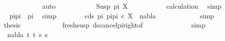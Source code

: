 \begin{isabellebody}
\ \ \ \ \ \ \ \ \isamarkupfalse%
\ {\isachardoublequoteopen}{}{\isachardoublequoteclose}{\isacharparenleft}{\kern0pt}{}{\isacharparenright}{\kern0pt}\ \isamarkupfalse%
\ auto\isanewline
\ \ \ \ \ \ \isamarkupfalse%
\ \isamarkupfalse%
\ {\isachardoublequoteopen}{\isachardot}{\kern0pt}{\isachardot}{\kern0pt}{\isachardot}{\kern0pt}\ {\isacharequal}{\kern0pt}\ Susp\ pi{}\ X{\isachardoublequoteclose}\isanewline
\ \ \ \ \ \ \ \ \isamarkupfalse%
\ {}{\isacharparenleft}{\kern0pt}{}{\isacharparenright}{\kern0pt}\ calculation\ \isamarkupfalse%
\ simp\isanewline
\ \ \ \ \ \ \isamarkupfalse%
\ \isamarkupfalse%
\ {\isachardoublequoteopen}pi{\isacharat}{\kern0pt}pi{}\ {\isacharequal}{\kern0pt}\ pi{}{\isachardoublequoteclose}\ \isamarkupfalse%
\ simp\isanewline
\ \ \ \ \ \ \isamarkupfalse%
\ {\isachardoublequoteopen}{\isasymforall}c{\isasymin}ds\ pi{}\ {\isacharparenleft}{\kern0pt}pi{\isacharat}{\kern0pt}pi{}{\isacharparenright}{\kern0pt}{\isachardot}{\kern0pt}\ {\isacharparenleft}{\kern0pt}c{\isacharcomma}{\kern0pt}\ X{\isacharparenright}{\kern0pt}\ {\isasymin}\ nabla{\isachardoublequoteclose}\isanewline
\ \ \ \ \ \ \ \ \isamarkupfalse%
\ {}{\isacharparenleft}{\kern0pt}{}{\isacharparenright}{\kern0pt}\ \isamarkupfalse%
\ simp\isanewline
\ \ \ \ \ \ \isamarkupfalse%
\ \isamarkupfalse%
\ {\isacharquery}{\kern0pt}thesis\ \isanewline
\ \ \ \ \ \ \ \ \isamarkupfalse%
\ {\isachardoublequoteopen}{}{\isachardoublequoteclose}{\isacharparenleft}{\kern0pt}{}{\isacharcomma}{\kern0pt}{}{\isacharparenright}{\kern0pt}\ fresh{\isacharunderscore}{\kern0pt}susp\ ds{\isacharunderscore}{\kern0pt}cancel{\isacharunderscore}{\kern0pt}pi{\isacharunderscore}{\kern0pt}right{\isacharbrackleft}{\kern0pt}of\ {\isacharunderscore}{\kern0pt}\ {\isacharunderscore}{\kern0pt}\ {\isachardoublequoteopen}{\isacharbrackleft}{\kern0pt}{\isacharbrackright}{\kern0pt}{\isachardoublequoteclose}\ {\isacharunderscore}{\kern0pt}{\isacharbrackright}{\kern0pt}\isanewline
\ \ \ \ \ \ \ \ \isamarkupfalse%
\ simp\isanewline
\ \ \ \ \isamarkupfalse%
\isanewline
\ \ \ \ \ \ \isamarkupfalse%
\ {\isacharparenleft}{\kern0pt}{}\ nabla\ t{}\ t{}\ s{}\ s{}{\isacharparenright}{\kern0pt}\isanewline

\end{isabellebody}
